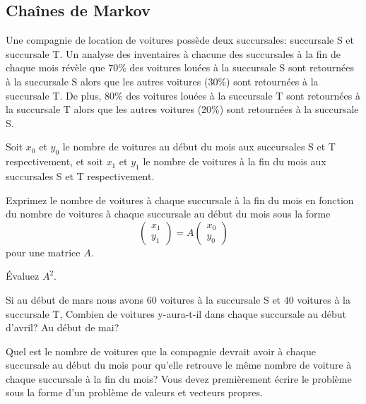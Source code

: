 \subsection{Chaînes de Markov}

\begin{question}[\eco]
Une compagnie de location de voitures possède deux succursales:
succursale S et succursale T.  Un analyse des inventaires à chacune
des succursales à la fin de chaque mois révèle que $70$\% des voitures
louées à la succursale S sont retournées à la succursale S alors que
les autres voitures ($30$\%) sont retournées à la succursale T.  De
plus, $80$\% des voitures louées à la succursale T sont retournées à
la succursale T alors que les autres voitures ($20$\%) sont retournées
à la succursale S.

Soit $x_0$ et $y_0$ le nombre de voitures au début du mois aux succursales
S et T respectivement, et soit $x_1$ et $y_1$ le nombre de voitures à
la fin du mois aux succursales S et T respectivement.

 Exprimez le nombre de voitures à chaque succursale à la fin du
mois en fonction du nombre de voitures à chaque succursale au
début du mois sous la forme
\[
\begin{pmatrix} x_1 \\ y_1 \end{pmatrix} = A
\begin{pmatrix} x_0 \\ y_0 \end{pmatrix}
\]
pour une matrice $A$.

 Évaluez $A^2$.

 Si au début de mars nous avons $60$ voitures à la succursale S et
$40$ voitures à la succursale T, Combien de voitures y-aura-t-il dans
chaque succursale au début d'avril?  Au début de mai?

 Quel est le nombre de voitures que la compagnie devrait avoir
à chaque succursale au début du mois pour qu'elle retrouve le même
nombre de voiture à chaque succursale à la fin du mois?  Vous devez
premièrement écrire le problème sous la forme d'un problème de valeurs
et vecteurs propres.
\label{12Q13}
\end{question}

